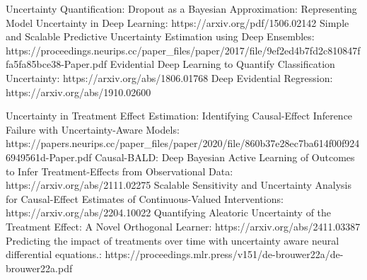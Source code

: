 Uncertainty Quantification:
Dropout as a Bayesian Approximation: Representing Model Uncertainty in Deep Learning: https://arxiv.org/pdf/1506.02142
Simple and Scalable Predictive Uncertainty Estimation using Deep Ensembles: https://proceedings.neurips.cc/paper_files/paper/2017/file/9ef2ed4b7fd2c810847ffa5fa85bce38-Paper.pdf
Evidential Deep Learning to Quantify Classification Uncertainty: https://arxiv.org/abs/1806.01768
Deep Evidential Regression: https://arxiv.org/abs/1910.02600

Uncertainty in Treatment Effect Estimation:
Identifying Causal-Effect Inference Failure with Uncertainty-Aware Models: https://papers.neurips.cc/paper_files/paper/2020/file/860b37e28ec7ba614f00f9246949561d-Paper.pdf
Causal-BALD: Deep Bayesian Active Learning of Outcomes to Infer Treatment-Effects from Observational Data: https://arxiv.org/abs/2111.02275
Scalable Sensitivity and Uncertainty Analysis for Causal-Effect Estimates of Continuous-Valued Interventions: https://arxiv.org/abs/2204.10022
Quantifying Aleatoric Uncertainty of the Treatment Effect: A Novel Orthogonal Learner: https://arxiv.org/abs/2411.03387
Predicting the impact of treatments over time with uncertainty aware neural differential equations.: https://proceedings.mlr.press/v151/de-brouwer22a/de-brouwer22a.pdf
